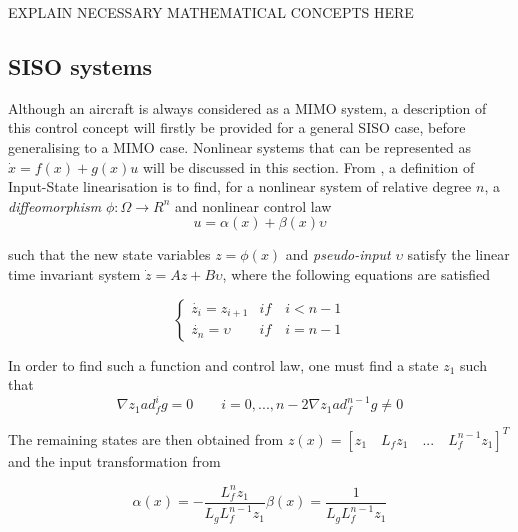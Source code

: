 EXPLAIN NECESSARY MATHEMATICAL CONCEPTS HERE

\subsection{SISO systems}
\label{section:background/SISO_NLI}

Although an aircraft is always considered as a MIMO system, a description of this control concept will firstly be provided for a general SISO case, before generalising to a MIMO case. Nonlinear systems that can be represented as $\dot{x}=f(x)+g(x)u$ will be discussed in this section. From \cite{Slotine+Li}, a definition of Input-State linearisation is to find, for a nonlinear system of relative degree $n$, a \emph{diffeomorphism} $\phi:\Omega \rightarrow R^n$ and nonlinear control law
\begin{equation}
u=\alpha(x) + \beta(x)\upsilon
\label{eq:nli_control_law}
\end{equation}

such that the new state variables $z=\phi(x)$ and \emph{pseudo-input} $\upsilon$ satisfy the linear time invariant system $\dot{z} = Az+B\upsilon$, where the following equations are satisfied

\begin{equation}
	\begin{cases}
		\dot{z_i}=z_{i+1} & if\quad i<n-1\\
		\dot{z_n}=\upsilon & if\quad i=n-1
	\end{cases}
	\label{eq:SISO_state}
\end{equation}

In order to find such a function and control law, one must find a state $z_1$ such that 
\begin{subequations}
	\begin{equation}
		\nabla z_1 ad_f^ig=0 \qquad i=0, ..., n-2
	\end{equation}
	\begin{equation}
		\nabla z_1 ad_f^{n-1}g\neq 0
	\end{equation}
\end{subequations}

The remaining states are then obtained from $z(x) = [z_1 \quad L_fz_1 \quad ... \quad L_f^{n-1}z_1]^T$ and the input transformation from

\begin{subequations}
	\begin{equation}
		\alpha (x) = - \dfrac{L_f^nz_1}{L_gL_f^{n-1}z_1}
	\end{equation}
	\begin{equation}
		\beta (x) = \dfrac{1}{L_gL_f^{n-1}z_1}
	\end{equation}
\end{subequations}

